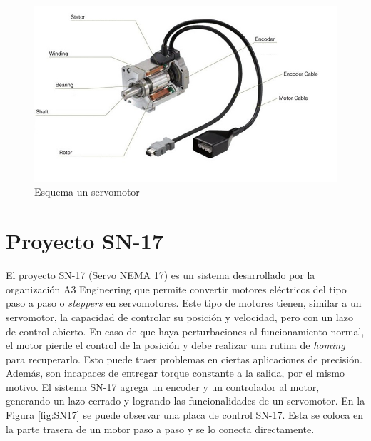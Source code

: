 \begin{figure}[htbp]
	\centering
	\includegraphics[scale=0.6]{./Figures/servomotor.jpg}
	\caption{Esquema un servomotor\protect\footnotemark}
	\label{fig:servomotor}
\end{figure}



\section{Proyecto SN-17}

El proyecto SN-17 (Servo NEMA 17) es un sistema desarrollado por la organización A3 Engineering que permite convertir motores eléctricos del tipo paso a paso o \textit{steppers} en servomotores. Este tipo de motores tienen, similar a un servomotor, la capacidad de controlar su posición y velocidad, pero con un lazo de control abierto. En caso de que haya perturbaciones al funcionamiento normal, el motor pierde el control de la posición y debe realizar una rutina de \textit{homing} para recuperarlo. Esto puede traer problemas en ciertas aplicaciones de precisión. Además, son incapaces de entregar torque constante a la salida, por el mismo motivo. El sistema SN-17 agrega un encoder y un controlador al motor, generando un lazo cerrado y logrando las funcionalidades de un servomotor. En la Figura \ref{fig:SN17} se puede observar una placa de control SN-17. Esta se coloca en la parte trasera de un motor paso a paso y se lo conecta directamente.

